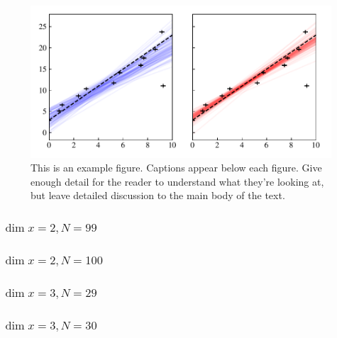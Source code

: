 \begin{figure}
	\includegraphics[width=\textwidth]{graphics/regression_Linear_1D1_cauchy.pdf}
    \caption{This is an example figure. Captions appear below each figure.
	Give enough detail for the reader to understand what they're looking at,
	but leave detailed discussion to the main body of the text.}
    \label{fig:example_widefigure}
\end{figure}

\subsubsection{$\dim x = 2, N = 99$}


\subsubsection{$\dim x = 2, N = 100$}


\subsubsection{$\dim x = 3, N = 29$}


\subsubsection{$\dim x = 3, N = 30$}


